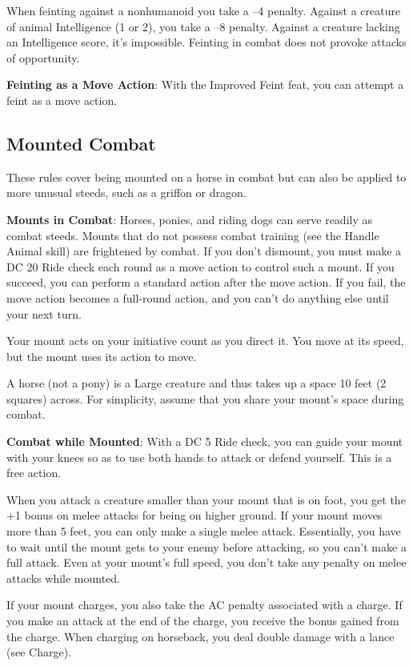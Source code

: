 When feinting against a nonhumanoid you take a --4 penalty. Against a creature of animal Intelligence (1 or 2), you take a --8 penalty. Against a creature lacking an Intelligence score, it's impossible. Feinting in combat does not provoke attacks of opportunity.
				
\textbf{Feinting as a Move Action}: With the Improved Feint feat, you can attempt a feint as a move action.
				
\subsection{Mounted Combat}

				
These rules cover being mounted on a horse in combat but can also be applied to more unusual steeds, such as a griffon or dragon.
				
\textbf{Mounts in Combat}: Horses, ponies, and riding dogs can serve readily as combat steeds. Mounts that do not possess combat training (see the Handle Animal skill) are frightened by combat. If you don't dismount, you must make a DC 20 Ride check each round as a move action to control such a mount. If you succeed, you can perform a standard action after the move action. If you fail, the move action becomes a full-round action, and you can't do anything else until your next turn.
				
Your mount acts on your initiative count as you direct it. You move at its speed, but the mount uses its action to move.
				
A horse (not a pony) is a Large creature and thus takes up a space 10 feet (2 squares) across. For simplicity, assume that you share your mount's space during combat.
				
\textbf{Combat while Mounted}: With a DC 5 Ride check, you can guide your mount with your knees so as to use both hands to attack or defend yourself. This is a free action.
				
When you attack a creature smaller than your mount that is on foot, you get the +1 bonus on melee attacks for being on higher ground. If your mount moves more than 5 feet, you can only make a single melee attack. Essentially, you have to wait until the mount gets to your enemy before attacking, so you can't make a full attack. Even at your mount's full speed, you don't take any penalty on melee attacks while mounted.
				
If your mount charges, you also take the AC penalty associated with a charge. If you make an attack at the end of the charge, you receive the bonus gained from the charge. When charging on horseback, you deal double damage with a lance (see Charge).
				
